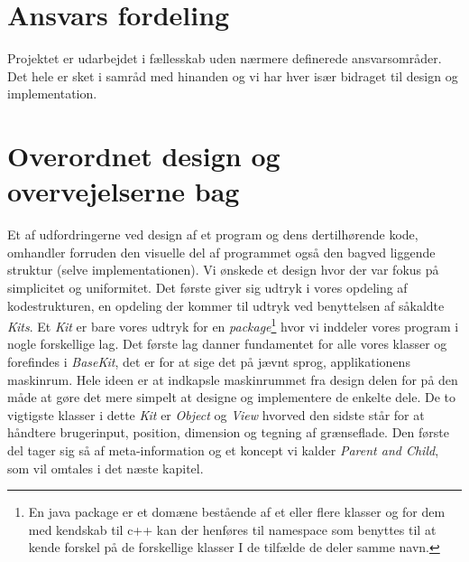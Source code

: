\documentclass[]{article}
\begin{document}
\section{Ansvars fordeling}

Projektet er udarbejdet i fællesskab uden nærmere definerede ansvarsområder. Det hele er sket i samråd med hinanden og vi har hver især bidraget til design og implementation.

\section{Overordnet design og overvejelserne bag}

Et af udfordringerne ved design af et program og dens dertilhørende kode, omhandler forruden den visuelle del af programmet også den bagved liggende struktur (selve implementationen). Vi ønskede et design hvor der var fokus på simplicitet og uniformitet. Det første giver sig udtryk i vores opdeling af kodestrukturen, en opdeling der kommer til udtryk ved benyttelsen af såkaldte \textit{Kits}. Et \textit{Kit} er bare vores udtryk for en \textit{package}\footnote{En java package er et domæne bestående af et eller flere klasser og for dem med kendskab til c++ kan der henføres til namespace som benyttes til at kende forskel på de forskellige klasser I de tilfælde de deler samme navn.} hvor vi inddeler vores program i nogle forskellige lag. Det første lag danner fundamentet for alle vores klasser og forefindes i \textit{BaseKit}, det er for at sige det på jævnt sprog, applikationens maskinrum. Hele ideen er at indkapsle maskinrummet fra design delen for på den måde at gøre det mere simpelt at designe og implementere de enkelte dele. De to vigtigste klasser i dette \textit{Kit} er \textit{Object} og \textit{View} hvorved den sidste står for at håndtere brugerinput, position, dimension og tegning af grænseflade. Den første del tager sig så af meta-information og et koncept vi kalder \textit{Parent and Child}, som vil omtales i det næste kapitel.
\end{document}

